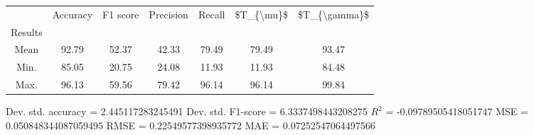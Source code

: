 \begin{tabular}{|c|c|c|c|c|c|c|}
\toprule
{} &  Accuracy &  F1 score &  Precision &  Recall &  \$T\_\{\textbackslash mu\}\$ &  \$T\_\{\textbackslash gamma\}\$ \\
Results &           &           &            &         &            &               \\
\hline
Mean    &     92.79 &     52.37 &      42.33 &   79.49 &      79.49 &         93.47 \\
Min.    &     85.05 &     20.75 &      24.08 &   11.93 &      11.93 &         84.48 \\
Max.    &     96.13 &     59.56 &      79.42 &   96.14 &      96.14 &         99.84 \\
\bottomrule
\end{tabular}

 Dev. std. accuracy = 2.445117283245491
 Dev. std. F1-score = 6.3337498443208275
 $R^2$ = -0.09789505418051747
 MSE = 0.050848344087059495
 RMSE = 0.22549577398935772
 MAE = 0.07252547064497566